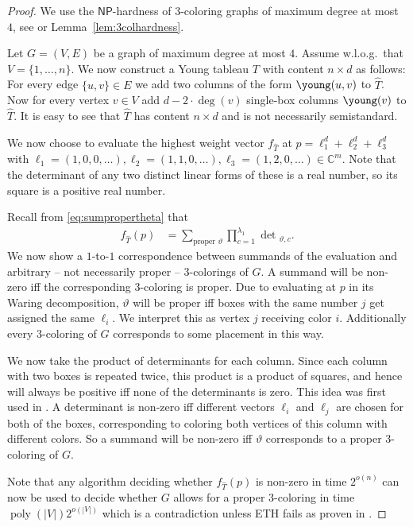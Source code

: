 \documentclass[10pt,a4paper]{article}
\numberwithin{equation}{section}
\theoremstyle{definition}
\newcommand{\IC}{\mathbb{C}}
\newcommand{\NP}{\ensuremath{\mathsf{NP}}}
\DeclareMathOperator{\poly}{poly}
\begin{document}
\begin{proof}
    We use the $\NP$-hardness of $3$-coloring graphs of maximum degree at most $4$, see \cite{DBLP:journals/tcs/GareyJS76} or Lemma~\ref{lem:3colhardness}.

    Let $G = (V, E)$ be a graph of maximum degree at most $4$.
    Assume w.l.o.g.\ that $V = \{1, \ldots, n\}$.
    We now construct a Young tableau $T$ with content $n \times d$ as follows:
    For every edge $\{u,v\} \in E$ we add two columns of the form {\scriptsize $\young(u,v)$} to $\hat{T}$.
    Now for every vertex $v \in V$ add $d-2\cdot\deg(v)$ single-box columns {$\young(v)$} to $\hat{T}$.
    It is easy to see that $\hat{T}$ has content $n \times d$ and is not necessarily semistandard.

    We now choose to evaluate the highest weight vector $f_{\hat{T}}$ at $p = \ell_1^d + \ell_2^d + \ell_3^d$ with $\ell_1 = (1, 0, 0, \ldots), \ell_2 = (1, 1, 0, \ldots), \ell_3 = (1, 2, 0, \ldots) \in \IC^m$.
    Note that the determinant of any two distinct linear forms of these is a real number, so its square is a positive real number.

    Recall from \eqref{eq:sumpropertheta} that
\begin{align*}
    f_{\hat{T}}(p) &= \sum_{\text{proper\ }\vartheta} \prod_{c = 1}^{\lambda_1}\det{}_{\vartheta,c}.
\end{align*}
    We now show a $1$-to-$1$ correspondence between summands of the evaluation and arbitrary -- not necessarily proper -- $3$-colorings of $G$.
    A summand will be non-zero iff the corresponding $3$-coloring is proper.
%
    Due to evaluating at $p$ in its Waring decomposition, $\vartheta$ will be proper iff boxes with the same number $j$ get assigned the same $\ell_i$.
    We interpret this as vertex $j$ receiving color $i$.
    Additionally every $3$-coloring of $G$ corresponds to some placement in this way.

    We now take the product of determinants for each column.
    Since each column with two boxes is repeated twice, this product is a product of squares, and hence will always be positive iff none of the determinants is zero. This idea was first used in \cite{bci:10}.
    A determinant is non-zero iff different vectors $\ell_i$ and $\ell_j$ are chosen for both of the boxes, corresponding to coloring both vertices of this column with different colors.
    So a summand will be non-zero iff $\vartheta$ corresponds to a proper $3$-coloring of $G$.

    Note that any algorithm deciding whether $f_{\hat{T}}(p)$ is non-zero in time $2^{o(n)}$ can now be used to decide whether $G$ allows for a proper $3$-coloring in time $\poly(|V|)2^{o(|V|)}$ which is a contradiction unless ETH fails as proven in \cite{DBLP:journals/jcss/ImpagliazzoPZ01}.
\end{proof}
\end{document}
